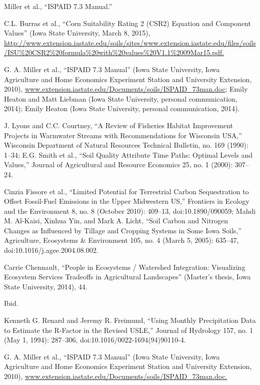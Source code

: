 \documentclass[11pt]{article}
\begin{document}
\begin{itemize}
\begin{thebibliography}{1}
  Miller et al., “ISPAID 7.3 Manual.”
  
  C.L. Burras et al., “Corn Suitability Rating 2 (CSR2) Equation and Component Values” (Iowa State University, March 8, 2015), \url{http://www.extension.iastate.edu/soils/sites/www.extension.iastate.edu/files/soils/ISU\%20CSR2\%20formula\%20with\%20values\%20V1.1\%2009Mar15.pdf.}
  
   G. A. Miller et al., “ISPAID 7.3 Manual” (Iowa State University, Iowa Agriculture and Home Economics Experiment Station and University Extension, 2010), \url{www.extension.iastate.edu/Documents/soils/ISPAID_73man.doc}; Emily Heaton and Matt Liebman (Iowa State University, personal communication, 2014); Emily Heaton (Iowa State University, personal communication, 2014).
  
    J. Lyons and C.C. Courtney, “A Review of Fisheries Habitat Improvement Projects in Warmwater Streams with Recommendations for Wisconsin USA,” Wisconsin Department of Natural Resources Technical Bulletin, no. 169 (1990): 1–34; E.G. Smith et al., “Soil Quality Attribute Time Paths: Optimal Levels and Values,” Journal of Agricultural and Resource Economics 25, no. 1 (2000): 307–24.
 
  
Cinzia Fissore et al., “Limited Potential for Terrestrial Carbon Sequestration to Offset Fossil-Fuel Emissions in the Upper Midwestern US,” Frontiers in Ecology and the Environment 8, no. 8 (October 2010): 409–13, doi:10.1890/090059; Mahdi M. Al-Kaisi, Xinhua Yin, and Mark A. Licht, “Soil Carbon and Nitrogen Changes as Influenced by Tillage and Cropping Systems in Some Iowa Soils,” Agriculture, Ecosystems & Environment 105, no. 4 (March 5, 2005): 635–47, doi:10.1016/j.agee.2004.08.002.

    Carrie Chennault, “People in Ecosystems / Watershed Integration: Visualizing Ecosystem Services Tradeoffs in Agricultural Landscapes” (Master’s thesis, Iowa State University, 2014), 44.
  
   Ibid.
  
    Kenneth G. Renard and Jeremy R. Freimund, “Using Monthly Precipitation Data to Estimate the R-Factor in the Revised USLE,” Journal of Hydrology 157, no. 1 (May 1, 1994): 287–306, doi:10.1016/0022-1694(94)90110-4.
  
   G. A. Miller et al., “ISPAID 7.3 Manual” (Iowa State University, Iowa Agriculture and Home Economics Experiment Station and University Extension, 2010), \url{www.extension.iastate.edu/Documents/soils/ISPAID_73man.doc.}
  

\end{thebibliography}
\end{itemize}
\end{document}
